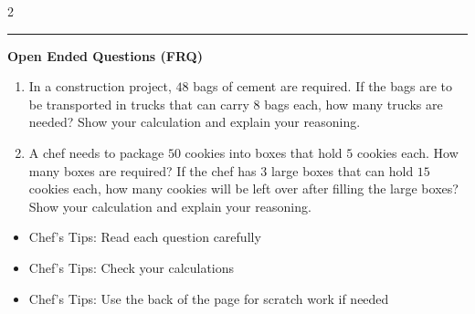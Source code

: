 \documentclass[10pt]{article}
\begin{document}
\begin{multicols}{2}
\begin{enumerate}[label=\textbf{Q\arabic*.}, leftmargin=*, itemsep=6pt, parsep=0pt]
\end{enumerate}
\end{multicols}

\vspace{-0.2cm}
\hrule
\vspace{0.2cm}
\textbf{\small Open Ended Questions (FRQ)}
\begin{enumerate}[label=\textbf{Q\arabic*.}, start=9, itemsep=5pt, topsep=0pt]

  \item \small In a construction project, $48$ bags of cement are required. If the bags are to be transported in trucks that can carry $8$ bags each, how many trucks are needed? Show your calculation and explain your reasoning. \vspace{2cm}

  \item \small A chef needs to package $50$ cookies into boxes that hold $5$ cookies each. How many boxes are required? If the chef has $3$ large boxes that can hold $15$ cookies each, how many cookies will be left over after filling the large boxes? Show your calculation and explain your reasoning. \vspace{2cm}

\end{enumerate}

\vfill

\begin{tcolorbox}[colback=blue!5, colframe=mainblue!50, title=\small \textbf{Chef's Tips}, fonttitle=\bfseries, bottom=1mm]
\begin{itemize}[noitemsep, topsep=2pt, leftmargin=0.5cm]
  \item \scriptsize Chef's Tips: Read each question carefully\item \scriptsize Chef's Tips: Check your calculations\item \scriptsize Chef's Tips: Use the back of the page for scratch work if needed
\end{itemize}
\end{tcolorbox}
\end{document}
